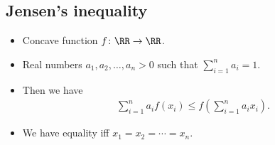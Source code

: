 %
%

\subsection{Jensen's inequality}

\begin{frame}
  \begin{theorem}
    \begin{itemize}
      \item Concave function \(f\colon \RR\to \RR\).
      \item Real numbers \(a_1, a_2,\ldots, a_n > 0\) such that \(\sum_{i=1}^n 
          a_i = 1\).
      \item Then we have
        \begin{align*}
          \sum_{i=1}^n a_i f(x_i) \leq f\left( \sum_{i=1}^n a_i x_i\right).
        \end{align*}
      \item We have equality iff \(x_1 = x_2 = \cdots = x_n\).
    \end{itemize}
  \end{theorem}
\end{frame}

